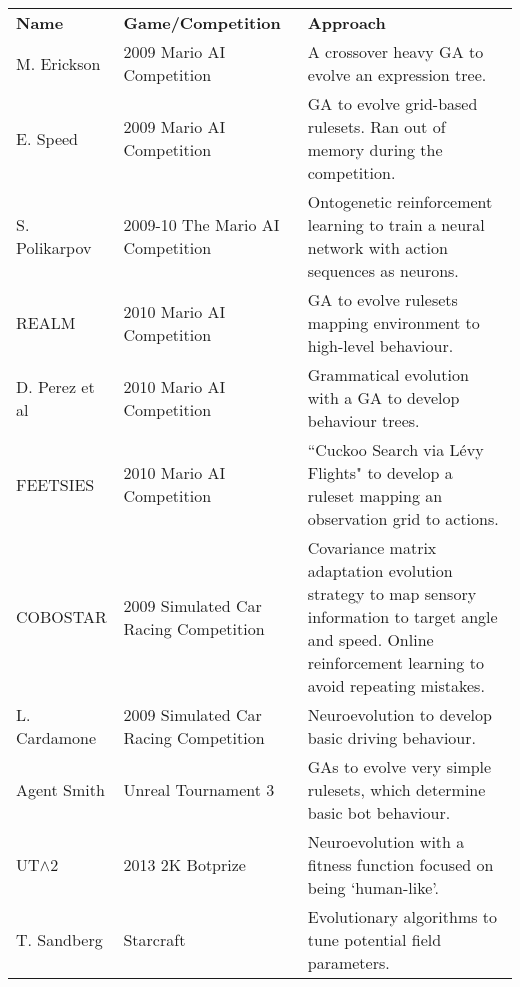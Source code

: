 \begin{table}
  \begin{adjustwidth}{-4cm}{-4cm}
  \begin{center} \small
    \begin{tabular}{ | >{\raggedright}p{2.2cm} | >{\raggedright}p{3.5cm} | p{6.8cm} |}
    \hline
    \textbf{Name} & \textbf{Game/Competition} & \textbf{Approach} \TBstrut \\ \thickhline
    
    M. Erickson \cite{2012the} & 2009 Mario AI Competition &
    A crossover heavy GA to evolve an expression tree.
    \\ \hline
    E. Speed \cite{2010the} & 2009 Mario AI Competition &
    GA to evolve grid-based rulesets. Ran out of memory during the competition.
    \\ \hline
    S. Polikarpov \cite[p.~7]{2010the} & 2009-10 The Mario AI Competition &
    Ontogenetic reinforcement learning to train a neural network with action sequences as neurons.
    \\ \hline
    REALM \cite{realm} & 2010 Mario AI Competition &
    GA to evolve rulesets mapping environment to high-level behaviour.
    \\ \hline
    D. Perez et al \cite{gramev} & 2010 Mario AI Competition &
    Grammatical evolution with a GA to develop behaviour trees. 
    \\ \hline
    FEETSIES \cite{feetsies} & 2010 Mario AI Competition &
    ``Cuckoo Search via L\'evy Flights" to develop a ruleset mapping an observation grid to actions. 
    \\ \hline
    COBOSTAR \cite[p.~136]{scrc} & 2009 Simulated Car Racing Competition &
    Covariance matrix adaptation evolution strategy to map sensory information to target angle and speed.
    Online reinforcement learning to avoid repeating mistakes.
    \\ \hline
    L. Cardamone \cite[p.~137]{scrc} & 2009 Simulated Car Racing Competition &
    Neuroevolution to develop basic driving behaviour.
    \\ \hline
    Agent Smith \cite{agentsmith} & Unreal Tournament 3 &
    GAs to evolve very simple rulesets, which determine basic bot behaviour.
     \\ \hline
    UT$\wedge$2 \cite{2kbot} & 2013 2K Botprize &
    Neuroevolution with a fitness function focused on being `human-like'.
    \\ \hline
    T. Sandberg \cite{emapf} & Starcraft &
    Evolutionary algorithms to tune potential field parameters.

\end{tabular}
\end{center}
\end{adjustwidth}
\end{table}
